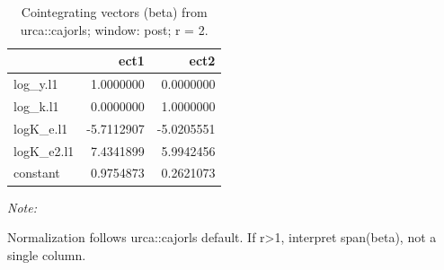 \begin{table}[!h]
\centering
\caption{Cointegrating vectors (beta) from urca::cajorls; window: post; r = 2.}
\centering
\begin{threeparttable}
\begin{tabular}[t]{lrr}
\toprule
  & ect1 & ect2\\
\midrule
log\_y.l1 & 1.0000000 & 0.0000000\\
log\_k.l1 & 0.0000000 & 1.0000000\\
logK\_e.l1 & -5.7112907 & -5.0205551\\
logK\_e2.l1 & 7.4341899 & 5.9942456\\
constant & 0.9754873 & 0.2621073\\
\bottomrule
\end{tabular}
\begin{tablenotes}
\item \textit{Note: } 
\item Normalization follows urca::cajorls default. If r>1, interpret span(beta), not a single column.
\end{tablenotes}
\end{threeparttable}
\end{table}
